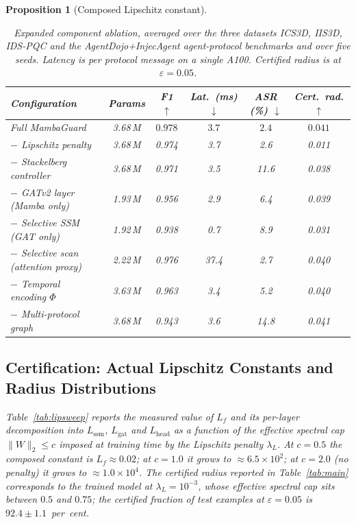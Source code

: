 \documentclass{ieeeaccess}
\newtheorem{proposition}[theorem]{Proposition}
\begin{document}
\begin{proposition}[Composed Lipschitz constant]
\begin{table}[!t]
\centering
\caption{Expanded component ablation, averaged over the three datasets ICS3D, IIS3D, IDS-PQC and the AgentDojo+InjecAgent agent-protocol benchmarks and over five seeds. Latency is per protocol message on a single A100. Certified radius is at $\varepsilon=0.05$.}
\label{tab:ablation}
\renewcommand{\arraystretch}{1.15}
\setlength{\tabcolsep}{4pt}
\footnotesize
\begin{tabular}{@{}lccccc@{}}
\toprule
\textbf{Configuration} & \textbf{Params} & \textbf{F1} $\uparrow$ & \textbf{Lat.\ (ms)} $\downarrow$ & \textbf{ASR (\%)} $\downarrow$ & \textbf{Cert.\ rad.} $\uparrow$ \\
\midrule
Full MambaGuard              & 3.68\,M & $\mathbf{0.978}$ & $\mathbf{3.7}$ & $\mathbf{2.4}$ & $\mathbf{0.041}$ \\
$-$ Lipschitz penalty        & 3.68\,M & 0.974 & 3.7 & 2.6 & 0.011 \\
$-$ Stackelberg controller    & 3.68\,M & 0.971 & 3.5 & 11.6 & 0.038 \\
$-$ GATv2 layer (Mamba only)  & 1.93\,M & 0.956 & 2.9 & 6.4 & 0.039 \\
$-$ Selective SSM (GAT only)  & 1.92\,M & 0.938 & 0.7 & 8.9 & 0.031 \\
$-$ Selective scan (attention proxy) & 2.22\,M & 0.976 & 37.4 & 2.7 & 0.040 \\
$-$ Temporal encoding $\Phi$  & 3.63\,M & 0.963 & 3.4 & 5.2 & 0.040 \\
$-$ Multi-protocol graph     & 3.68\,M & 0.943 & 3.6 & 14.8 & 0.041 \\
\bottomrule
\end{tabular}
\end{table}

\subsection{Certification: Actual Lipschitz Constants and Radius Distributions}
\label{sec:cert-empirical}
Table~\ref{tab:lipsweep} reports the measured value of $L_{f}$ and its per-layer decomposition into $L_{\text{ssm}}$, $L_{\text{gat}}$ and $L_{\text{head}}$ as a function of the effective spectral cap $\|W\|_{2}\le c$ imposed at training time by the Lipschitz penalty $\lambda_{L}$. At $c=0.5$ the composed constant is $L_{f}\approx 0.02$; at $c=1.0$ it grows to $\approx 6.5\!\times\!10^{2}$; at $c=2.0$ (no penalty) it grows to $\approx 1.0\!\times\!10^{4}$. The certified radius reported in Table~\ref{tab:main} corresponds to the trained model at $\lambda_{L}=10^{-3}$, whose effective spectral cap sits between $0.5$ and $0.75$; the certified fraction of test examples at $\varepsilon=0.05$ is $92.4\pm 1.1$~per~cent.


\end{proposition}
\end{document}
